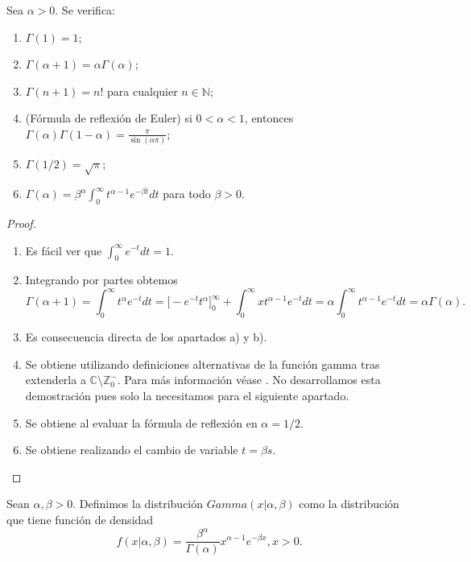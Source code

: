 \documentclass{article}
\begin{document}
\begin{prop}
    Sea $\alpha > 0$. Se verifica:
    \begin{enumerate}
        \item $\Gamma(1) = 1$;
	\item $\Gamma(\alpha+1) = \alpha\Gamma(\alpha)$;
    \item $\Gamma(n+1) = n!$ para cualquier $n \in \mathbb{N}$;
    \item (Fórmula de reflexión de Euler) si $0 < \alpha < 1$, entonces $\Gamma(\alpha) \Gamma(1- \alpha) = \frac{\pi}{\sin(\alpha \pi)}$;
    \item $\Gamma(1/2) = \sqrt{\pi}$;
    \item $\Gamma(\alpha) = \beta^\alpha\int_0^\infty t^{\alpha-1}e^{-\beta t} dt$ para todo $\beta > 0$.
    \end{enumerate}
\end{prop}
\begin{proof}
    \
    \begin{enumerate}
        \item Es fácil ver que $\int_{0}^\infty e^{-t} dt = 1$.
        \item Integrando por partes obtemos
        \[\Gamma(\alpha+1) = \int_0^{\infty}{t^{\alpha}e^{-t}dt} = \bigg[-e^{-t}t^\alpha\bigg]_0^{\infty} +
            \int_0^{\infty}{xt^{\alpha-1}e^{-t}dt} = \alpha\int_0^{\infty}{t^{\alpha-1}e^{-t}dt} = \alpha\Gamma(\alpha).\]
        \item Es consecuencia directa de los apartados a) y b).
        \item Se obtiene utilizando definiciones alternativas de la función gamma tras extenderla a $\mathbb{C} \setminus \mathbb{Z}^-_0$. Para más información véase \cite{gamma}. No desarrollamos esta demostración pues solo la necesitamos para el siguiente apartado.
        \item Se obtiene al evaluar la fórmula de reflexión en $\alpha = 1/2$.
        \item Se obtiene realizando el cambio de variable $t = \beta s$. \qedhere
    \end{enumerate}
\end{proof}

\begin{definition}
    Sean $\alpha, \beta > 0$. Definimos la distribución $Gamma(x | \alpha, \beta)$ como la distribución que tiene función de densidad
    \[f(x | \alpha, \beta) = \frac{\beta^\alpha}{\Gamma(\alpha)}x^{\alpha-1}e^{-\beta x}, x > 0.\]
\end{definition}
\end{document}
